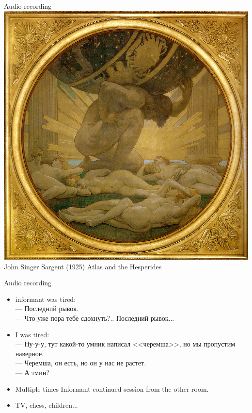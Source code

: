 \documentclass[13pt, t]{beamer}
\begin{document}
\begin{frame}{Audio recording}
\includegraphics[width = 0.7\linewidth]{images/05_atlas}\\
\small John Singer Sargent (1925) Atlas and the Hesperides 
\end{frame}

\begin{frame}{Audio recording}
\begin{itemize}
\item informant was tired:\\
--- Последний рывок.\\
--- Что уже пора тебе сдохнуть?.. Последний рывок...
\item I was tired:\\
--- Ну-у-у, тут какой-то умник написал <<черемша>>, но мы пропустим наверное.\\
--- Черемша, он есть, но он у нас не растет.\\
--- А тмин?
\item Multiple times Informant continued session from the other room.
\item TV, chess, children...
\end{itemize}
\end{frame}
\end{document}

